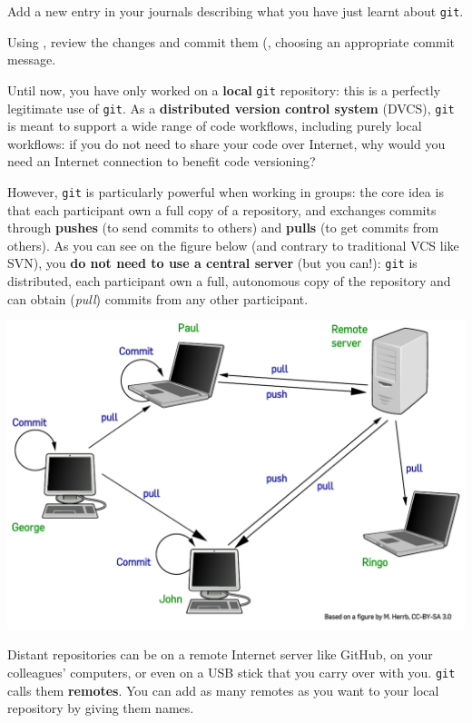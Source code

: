 \documentclass{instructions}
\newcommand{\git}{\texttt{git}\xspace}
\begin{document}

Add a new entry in your journals describing what you have just learnt about
\git.

Using , review the changes and commit them (, choosing an appropriate commit message.


Until now, you have only worked on a \textbf{local} \git repository: this is a
perfectly legitimate use of \git. As a \textbf{distributed version control
system} (DVCS), \git is meant to support a wide range of code workflows,
including purely local workflows: if you do not need to share your code over
Internet, why would you need an Internet connection to benefit code versioning?

However, \git is particularly powerful when working in groups: the core idea is
that each participant own a full copy of a repository, and exchanges commits
through \textbf{pushes} (to send commits to others) and \textbf{pulls} (to get
commits from others). As you can see on the figure below (and contrary to
traditional VCS like SVN), you \textbf{do not
need to use a central server} (but you can!): \git is distributed, each
participant own a full, autonomous copy of the repository and can obtain
(\emph{pull}) commits from any other participant.

\begin{center}
    \includegraphics[width=0.8\linewidth]{figs/distributed-git.pdf}
\end{center}

Distant repositories can be on a remote Internet server like GitHub, on your
colleagues' computers,
or even on a USB stick that you carry over with you. \git calls them
\textbf{remotes}. You can add as many remotes as you want to your local
repository by giving them names.
\end{document}
